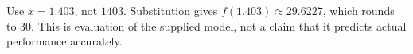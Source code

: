 Use $ x=1.403 $, not $ 1403 $. Substitution gives $ f(1.403)\approx29.6227 $, which rounds to $\boxed{30}$. This is evaluation of the supplied model, not a claim that it predicts actual performance accurately.
